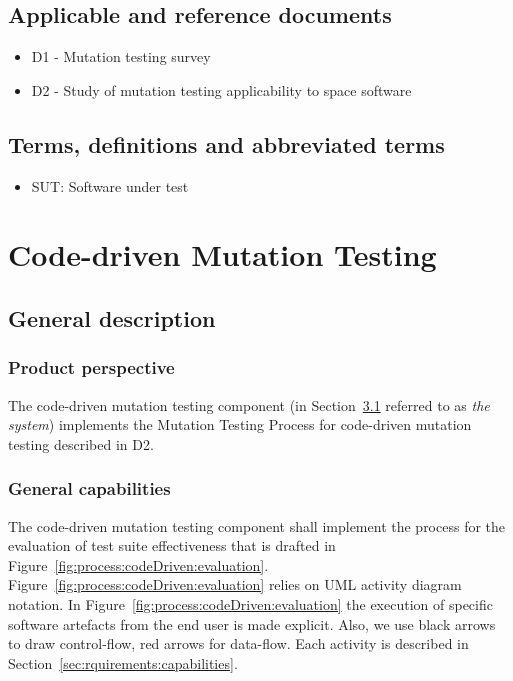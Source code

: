 
\section{Applicable and reference documents}

\begin{itemize}
\item{D1 - Mutation testing survey}
\item{D2 - Study of mutation testing applicability to space software}
\end{itemize}
\clearpage

\section{Terms, definitions and abbreviated terms}

\begin{itemize}
\item{SUT}: Software under test
\end{itemize}

\clearpage


\chapter{Code-driven Mutation Testing}

\section{General description}
\label{codeDriven}



\subsection{Product perspective}

\RQ{} The code-driven mutation testing component (in Section~\ref{codeDriven} referred to as \emph{the system}) implements the Mutation Testing Process for code-driven mutation testing described in D2.

\clearpage
\subsection{General capabilities}

\RQ{} The code-driven mutation testing component shall implement the process for the evaluation of test suite effectiveness that is drafted in Figure~\ref{fig:process:codeDriven:evaluation}. Figure~\ref{fig:process:codeDriven:evaluation} relies on UML activity diagram notation. In Figure~\ref{fig:process:codeDriven:evaluation} the execution of specific software artefacts from the end user is made explicit. Also, we use black arrows to draw control-flow, red arrows for data-flow. Each activity is described in Section~\ref{sec:rquirements:capabilities}.

